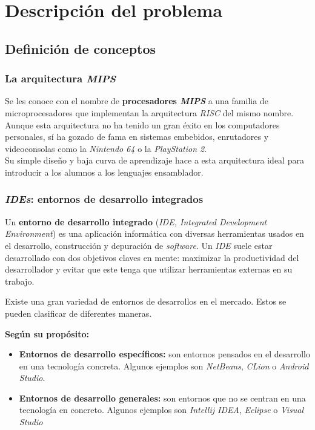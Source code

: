 \chapter{Descripción del problema} \label{ch:descripcion-del-problema}


\section{Definición de conceptos}\label{sec:definicion-de-conceptos}

\subsection{La arquitectura \textit{MIPS}}\label{subsec:la-arquitectura-mips}

Se les conoce con el nombre de \textbf{procesadores \textit{MIPS}} a una familia de microprocesadores que implementan
la arquitectura \textit{RISC} del mismo nombre.
Aunque esta arquitectura no ha tenido un gran éxito en los computadores personales, sí ha gozado de fama en
sistemas embebidos, enrutadores y videoconsolas como la \textit{Nintendo 64} o la \textit{PlayStation 2}. \\

\noindent Su simple diseño y baja curva de aprendizaje hace a esta arquitectura ideal para introducir a los alumnos
a los lenguajes ensamblador.

\subsection{\textit{IDEs}: entornos de desarrollo integrados}\label{subsec:ides-entornos-de-desarrollo-integrados}

Un \textbf{entorno de desarrollo integrado} (\textit{IDE, Integrated Development Environment}) es una aplicación
informática con diversas herramientas usados en el desarrollo, construcción y depuración de \textit{software}.
Un \textit{IDE} suele estar desarrollado con dos objetivos claves en mente: maximizar la productividad del
desarrollador y evitar que este tenga que utilizar herramientas externas en su trabajo.

\noindent Existe una gran variedad de entornos de desarrollos en el mercado.
Estos se pueden clasificar de diferentes maneras.

\noindent \textbf{Según su propósito:}
\begin{itemize}
    \item \textbf{Entornos de desarrollo específicos:} son entornos pensados en el desarrollo en una
    tecnología concreta.
    Algunos ejemplos son \textit{NetBeans}, \textit{CLion} o \textit{Android Studio}.
    \item \textbf{Entornos de desarrollo generales:} son entornos que no se centran en una tecnología en concreto.
    Algunos ejemplos son \textit{Intellij IDEA}, \textit{Eclipse} o \textit{Visual Studio}
\end{itemize}

